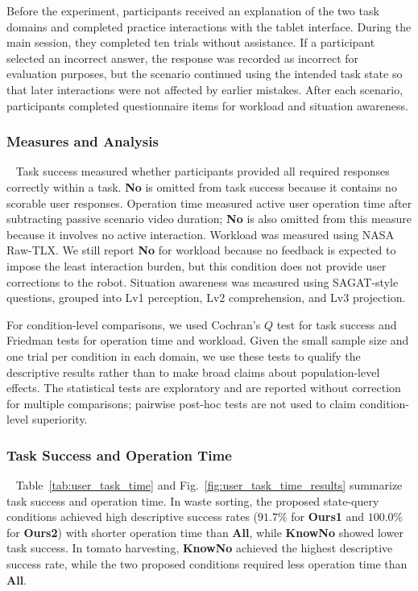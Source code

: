 Before the experiment, participants received an explanation of the two task domains and completed practice interactions with the tablet interface. During the main session, they completed ten trials without assistance. If a participant selected an incorrect answer, the response was recorded as incorrect for evaluation purposes, but the scenario continued using the intended task state so that later interactions were not affected by earlier mistakes. After each scenario, participants completed questionnaire items for workload and situation awareness.

\subsubsection{Measures and Analysis}~\label{user:measures}
Task success measured whether participants provided all required responses correctly within a task. \textbf{No} is omitted from task success because it contains no scorable user responses. Operation time measured active user operation time after subtracting passive scenario video duration; \textbf{No} is also omitted from this measure because it involves no active interaction. Workload was measured using NASA Raw-TLX. We still report \textbf{No} for workload because no feedback is expected to impose the least interaction burden, but this condition does not provide user corrections to the robot. Situation awareness was measured using SAGAT-style questions, grouped into Lv1 perception, Lv2 comprehension, and Lv3 projection.

For condition-level comparisons, we used Cochran's $Q$ test for task success and Friedman tests for operation time and workload. Given the small sample size and one trial per condition in each domain, we use these tests to qualify the descriptive results rather than to make broad claims about population-level effects. The statistical tests are exploratory and are reported without correction for multiple comparisons; pairwise post-hoc tests are not used to claim condition-level superiority.

\subsubsection{Task Success and Operation Time}~\label{user:results_task_time}
Table~\ref{tab:user_task_time} and Fig.~\ref{fig:user_task_time_results} summarize task success and operation time. In waste sorting, the proposed state-query conditions achieved high descriptive success rates ($91.7\%$ for \textbf{Ours1} and $100.0\%$ for \textbf{Ours2}) with shorter operation time than \textbf{All}, while \textbf{KnowNo} showed lower task success. In tomato harvesting, \textbf{KnowNo} achieved the highest descriptive success rate, while the two proposed conditions required less operation time than \textbf{All}.



